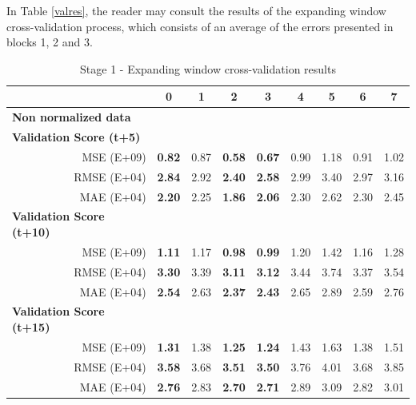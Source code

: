 In Table \ref{valres}, the reader may consult the results of the expanding window cross-validation process, which consists of an average of the errors presented in blocks 1, 2 and 3.

\begin{table}[htbp]
  \centering
  \caption{Stage 1 - Expanding window cross-validation results}
       \begin{tabular}{r|cccccccc}
    \toprule
    \multicolumn{1}{c}{} & 0     & 1     & 2     & 3     & 4     & 5     & 6     & 7 \\
    \midrule
    \multicolumn{1}{l|}{\textbf{Non normalized data}} &       &       &       &       &       &       &       &  \\
    \multicolumn{1}{l|}{\textbf{            Validation Score (t+5)      }} &       &       &       &       &       &       &       &  \\
    MSE (E+09)   & \textbf{0.82} & 0.87  & \textbf{0.58} & \textbf{0.67} & 0.90  & 1.18  & 0.91  & 1.02 \\
    RMSE (E+04)   & \textbf{2.84} & 2.92  & \textbf{2.40} & \textbf{2.58} & 2.99  & 3.40  & 2.97  & 3.16 \\
    MAE (E+04)   & \textbf{2.20} & 2.25  & \textbf{1.86} & \textbf{2.06} & 2.30  & 2.62  & 2.30  & 2.45 \\
    \multicolumn{1}{l|}{\textbf{            Validation Score (t+10)               }} &       &       &       &       &       &       &       &  \\
    MSE (E+09)   & \textbf{1.11} & 1.17  & \textbf{0.98} & \textbf{0.99} & 1.20  & 1.42  & 1.16  & 1.28 \\
    RMSE (E+04)   & \textbf{3.30} & 3.39  & \textbf{3.11} & \textbf{3.12} & 3.44  & 3.74  & 3.37  & 3.54 \\
    MAE (E+04)   & \textbf{2.54} & 2.63  & \textbf{2.37} & \textbf{2.43} & 2.65  & 2.89  & 2.59  & 2.76 \\
    \multicolumn{1}{l|}{\textbf{            Validation Score (t+15)               }} &       &       &       &       &       &       &       &  \\
    MSE (E+09)   & \textbf{1.31} & 1.38  & \textbf{1.25} & \textbf{1.24} & 1.43  & 1.63  & 1.38  & 1.51 \\
    RMSE (E+04)   & \textbf{3.58} & 3.68  & \textbf{3.51} & \textbf{3.50} & 3.76  & 4.01  & 3.68  & 3.85 \\
    MAE (E+04)   & \textbf{2.76} & 2.83  & \textbf{2.70} & \textbf{2.71} & 2.89  & 3.09  & 2.82  & 3.01 \\

\end{tabular}
\end{table}
